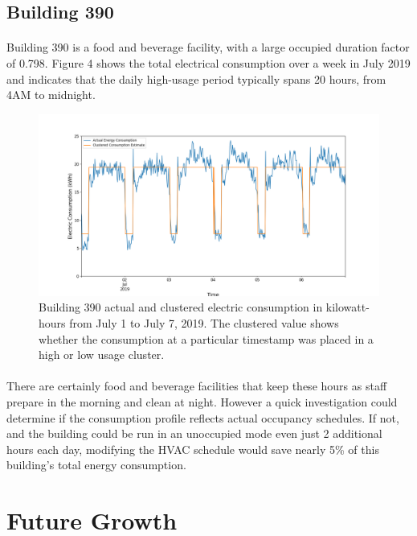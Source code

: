 \documentclass[a4paper]{article}
\begin{document}
\subsection{Building 390}

\paragraph{}
Building 390 is a food and beverage facility, with a large occupied duration factor of 0.798. Figure 4 shows the total electrical consumption over a week in July 2019 and indicates that the daily high-usage period typically spans 20 hours, from 4AM to midnight.

\begin{figure}[H]
\centering
\includegraphics[width=.9\columnwidth]{./images/390_Duration.png}
\caption{Building 390 actual and clustered electric consumption in kilowatt-hours from July 1 to July 7, 2019. The clustered value shows whether the consumption at a particular timestamp was placed in a high or low usage cluster.}
\end{figure}

\paragraph{}
There are certainly food and beverage facilities that keep these hours as staff prepare in the morning and clean at night. However a quick investigation could determine if the consumption profile reflects actual occupancy schedules. If not, and the building could be run in an unoccupied mode even just 2 additional hours each day, modifying the HVAC schedule would save nearly 5\% of this building's total energy consumption.

\section{Future Growth}
\end{document}
